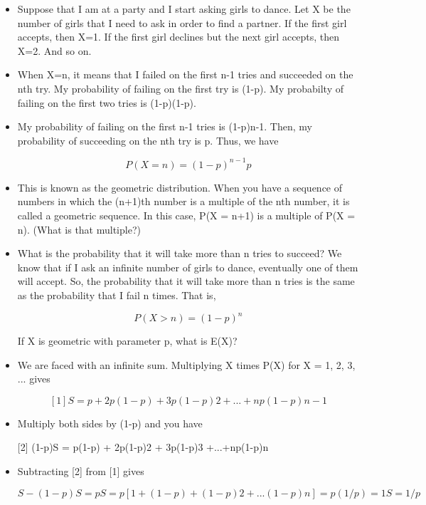\documentclass[]{report}
\begin{document}
\begin{itemize}
\item Suppose that I am at a party and I start asking girls to dance. Let X be the number of girls that I need to ask in order to find a partner. If the first girl accepts, then X=1. If the first girl declines but the next girl accepts, then X=2. And so on. 

\item When X=n, it means that I failed on the first n-1 tries and succeeded on the nth try. My probability of failing on the first try is (1-p). My probabilty of failing on the first two tries is (1-p)(1-p). 


\item My probability of failing on the first n-1 tries is (1-p)n-1. Then, my probability of succeeding on the nth try is p. Thus, we have 

\[ P(X = n) = (1-p)^{n-1}p \]

\item This is known as the geometric distribution. When you have a sequence of numbers in which the (n+1)th number is a multiple of the nth number, it is called a geometric sequence. In this case, P(X = n+1) is a multiple of P(X = n). (What is that multiple?) 

\item What is the probability that it will take more than n tries to succeed? We know that if I ask an infinite number of girls to dance, eventually one of them will accept. So, the probability that it will take more than n tries is the same as the probability that I fail n times. That is, 

\[ P(X > n) = (1-p)^n \]

If X is geometric with parameter p, what is E(X)? 

\item We are faced with an infinite sum. Multiplying X times P(X) for X = 1, 2, 3, ... gives 

\[
[1] S = p + 2p(1-p) + 3p(1-p)2 +...+np(1-p)n-1 
\]
\item Multiply both sides by (1-p) and you have

[2] (1-p)S = p(1-p) + 2p(1-p)2 + 3p(1-p)3 +...+np(1-p)n 


\item Subtracting [2] from [1] gives 

\[S - (1-p)S = pS = p[1 + (1-p) + (1-p)2 + ...(1-p)n] = p(1/p) = 1
S = 1/p \]


\end{itemize}
\end{document}
